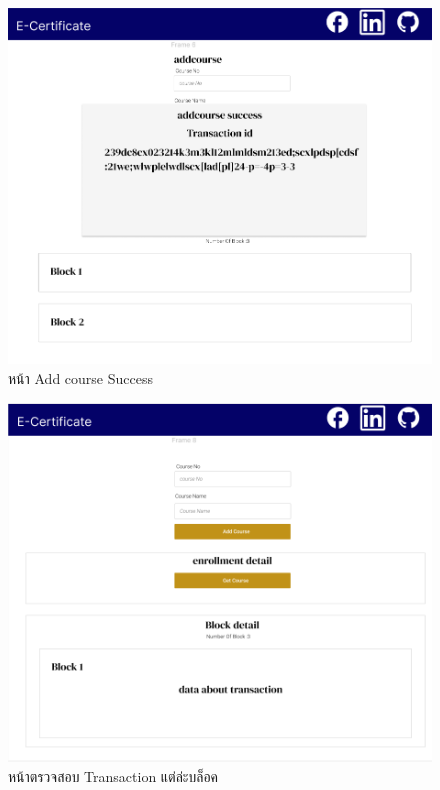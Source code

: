 \graphicspath{ {./images/} }
\begin{figure}[htbp]
  \centering 
  \includegraphics[scale=0.5]{addss.png}
  \caption[Peers Diagram 5]{หน้า Add course Success}
  \label{fig:add success}
\end{figure}

\graphicspath{ {./images/} }
\begin{figure}[htbp]
  \centering 
  \includegraphics[scale=0.5]{blocktr.png}
  \caption[Peers Diagram 5]{หน้าตรวจสอบ Transaction แต่ล่ะบล็อค}
  \label{fig:block}
\end{figure}

